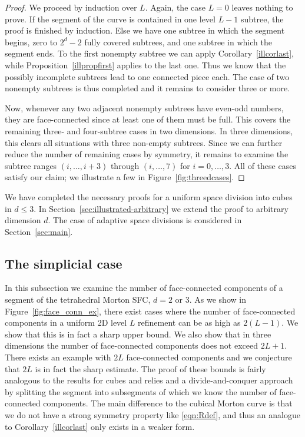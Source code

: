 \documentclass[a4paper,11pt]{article}
\newcommand{\eqnref}[1]{\eqref{eqn:#1}}
\newcommand{\figref}[1]{Figure~\ref{fig:#1}}
\newcommand{\seclab}[1]{\label{sec:#1}}
\newcommand{\secref}[1]{Section~\ref{sec:#1}}
\begin{document}
\begin{proof}
  We proceed by induction over $L$.
  Again, the case $L = 0$ leaves nothing to prove.  If the segment of the curve
  is contained in one level $L - 1$ subtree, the proof is finished by
  induction.  Else we have one subtree in which the segment begins, zero to
  $2^{d} - 2$ fully covered subtrees, and one subtree in which the segment
  ends.  To the first nonempty subtree we can apply Corollary~\ref{illcorlast},
  while Proposition~\ref{illpropfirst} applies to the last one.  Thus we know that
  the possibly incomplete subtrees lead to one connected piece each.  The case
  of two nonempty subtrees is thus completed and it remains to consider three
  or more.

  Now, whenever any two adjacent nonempty subtrees have even-odd numbers, they
  are face-connected since at least one of them must be full.  This covers the
  remaining three- and four-subtree cases in two dimensions.  In three
  dimensions, this clears all situations with three non-empty subtrees.  Since
  we can further reduce the number of remaining cases by symmetry, it remains
  to examine the subtree ranges $(i, \ldots, i + 3)$ through $(i, \ldots, 7)$
  for $i = 0, \ldots, 3$.  All of these cases satisfy our claim; we
  illustrate a few in \figref{threedcases}.
\end{proof}
We have completed the necessary proofs for a uniform space division into cubes
in $d \le 3$.
In \secref{illustrated-arbitrary} we extend the proof to arbitrary
dimension $d$.
The case of adaptive space divisions is considered in \secref{main}.

\subsection{The simplicial case}
\seclab{illustrated-simplicial}

In this subsection we examine the number of face-connected components of a
segment of the tetrahedral Morton SFC, $d = 2$ or $3$.
As we show in Figure~\ref{fig:face_conn_ex}, there exist cases where the number
of face-connected components in a uniform 2D level $L$ refinement can be as
high as $2(L-1)$.
We show that this is in fact a sharp upper bound.
We also show that in three dimensions the number of face-connected components
does not exceed $2L+1$. There exists an example with $2L$ face-connected
components and we conjecture that $2L$ is in fact the sharp estimate.
The proof of these bounds is fairly analogous to the results for cubes and 
relies and a divide-and-conquer approach by splitting the segment into 
subsegments of which we know the number of face-connected components.
The main difference to the cubical Morton curve is that we do not have a
strong symmetry property like \eqnref{Rdef}, and thus an analogue to
Corollary~\ref{illcorlast} only exists in a weaker form.
\end{document}
